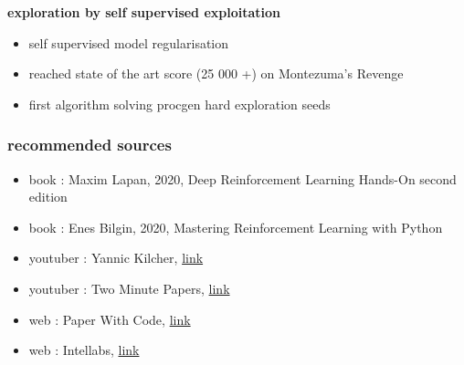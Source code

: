 \documentclass{beamer}
\begin{document}
\begin{frame}{\bf exploration by self supervised exploitation}


  \begin{itemize}
    \item self supervised model regularisation
    \item reached state of the art score (25 000 +) on Montezuma's Revenge
    \item first algorithm solving procgen hard exploration seeds
  \end{itemize} 
\end{frame}
  

\begin{frame}
  
  \frametitle{\bf recommended sources}

  \begin{itemize}
    \item book : Maxim Lapan, 2020, Deep Reinforcement Learning Hands-On second edition
    \item book : Enes Bilgin, 2020, Mastering Reinforcement Learning with Python
    \item youtuber : Yannic Kilcher, \href{https://www.youtube.com/c/YannicKilcher/videos}{link}
    \item youtuber : Two Minute Papers, \href{https://www.youtube.com/c/KárolyZsolnai/videos}{link}
    \item web : Paper With Code, \href{https://paperswithcode.com/methods/category/policy-gradient-methods}{link}
    \item web : Intellabs, \href{https://intellabs.github.io/coach/components/agents/index.html}{link}
  \end{itemize}

 
    
\end{frame}
\end{document}
